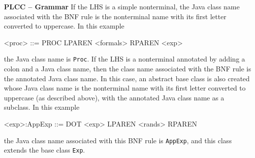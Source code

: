 \begin{minipage}[t]{\sw}
\slidenumber
\LARGE
{\bf PLCC -- Grammar}\exx
If the LHS is a simple nonterminal,
the Java class name associated with the BNF rule is the nonterminal name
with its first letter converted to uppercase.
In this example
{\Large
\begin{qv}
<proc> ::= PROC LPAREN <formals> RPAREN <exp>
\end{qv}
}
the Java class name is \verb'Proc'.\exx
If the LHS is a nonterminal annotated
by adding a colon and a Java class name,
then the class name associated with the BNF rule
is the annotated Java class name.
In this case, an abstract base class is also created
whose Java class name is the nonterminal name
with its first letter converted to uppercase (as described above),
with the annotated Java class name as a subclass.
In this example
{\Large
\begin{qv}
<exp>:AppExp ::= DOT <exp> LPAREN <rands> RPAREN
\end{qv}
}
the Java class name associated with this BNF rule is \verb'AppExp',
and this class extends the base class \verb'Exp'.
\end{minipage}
\clearpage
